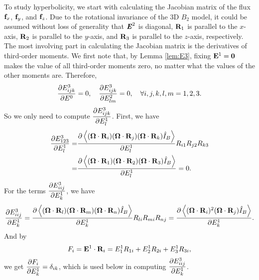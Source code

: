 To study hyperbolicity, we start with calculating the Jacobian
matrix of the flux $\mathbf{f}_x$, $\mathbf{f}_y$, and $\mathbf{f}_z$. Due to the rotational
invariance of the 3D $B_2$ model, it could be assumed without loss of
generality that $\boldsymbol{\mathit{E}}^2$ is diagonal, $\mathbf{R}_1$ is parallel to
the $x$-axis, $\mathbf{R}_2$ is parallel to the $y$-axis, and $\mathbf{R}_3$ is
parallel to the $z$-axis, respectively. The most involving part in
calculating the Jacobian matrix is the derivatives of third-order
moments. We first note that, by Lemma \ref{lem:E3}, fixing
$\mathbf{E}^1 = \boldsymbol{0}$ makes the value of all third-order moments
zero, no matter what the values of the other moments are. Therefore,
\[
\dfrac{\partial E^3_{ijk}}{\partial E^0} = 0, \quad \dfrac{\partial E^3_{ijk}}{\partial E^2_{lm}} = 0, 
\quad\forall i,j,k,l,m = 1,2,3.
\]
So we only need to compute $\dfrac{\partial E^3_{ijk}}{\partial E^1_l}$.
First, we have
\[
\begin{split}
  \dfrac{\partial E^3_{123}}{\partial E^1_l} = & \dfrac{\partial \left\langle (\boldsymbol{\Omega}\cdot\mathbf{R}_i) (\boldsymbol{\Omega}\cdot\mathbf{R}_j)
      (\boldsymbol{\Omega}\cdot\mathbf{R}_k) \hat I_B \right\rangle}{\partial E^1_l} R_{i1} R_{j2} R_{k3}\\
  = & \dfrac{\partial \left\langle (\boldsymbol{\Omega}\cdot\mathbf{R}_1) (\boldsymbol{\Omega}\cdot\mathbf{R}_2) (\boldsymbol{\Omega}\cdot\mathbf{R}_3) \hat I_B \right\rangle}{\partial E^1_l} 
  =  0.
\end{split}
\]
For the terms $\dfrac{\partial E^3_{iij}}{\partial E^1_k}$, we have
\[
\dfrac{\partial E^3_{iij}}{\partial E^1_k} = \dfrac{\partial \left\langle (\boldsymbol{\Omega}\cdot\mathbf{R}_l) (\boldsymbol{\Omega}\cdot\mathbf{R}_m)
    (\boldsymbol{\Omega}\cdot\mathbf{R}_n) \hat I_B \right\rangle}{\partial E^1_k} R_{li} R_{mi} R_{nj} 
= \dfrac{\partial \left\langle (\boldsymbol{\Omega}\cdot\mathbf{R}_i)^2 (\boldsymbol{\Omega}\cdot\mathbf{R}_j) \hat I_B \right\rangle}{\partial E^1_k}.
\]
And by
\[
F_i = \mathbf{E}^1\cdot\mathbf{R}_i = E^1_1 R_{1i} + E^1_2 R_{2i} + E^1_3 R_{3i},
\]
we get $\dfrac{\partial F_i}{\partial E^1_k} = \delta_{ik}$, which is used below in
computing $\dfrac{\partial E^3_{iij}}{\partial E^1_k}$.


